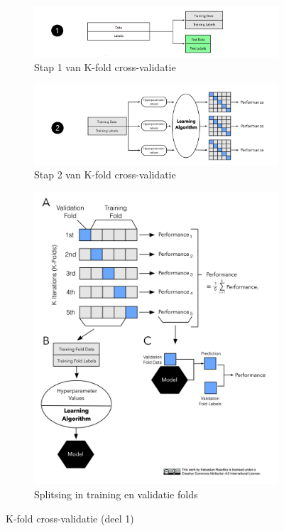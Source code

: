 \begin{figure}[h]
	\centering
	\begin{subfigure}{.70\textwidth}
		\centering
		\includegraphics[width=\linewidth]{images/21-kfold-step-1.png}
		\caption{Stap 1 van K-fold cross-validatie}
		\label{fig:kfold-step-1}
	\end{subfigure}
	\begin{subfigure}{.70\textwidth}
		\centering
		\includegraphics[width=\linewidth]{images/22-kfold-step-2.png}
		\caption{Stap 2 van K-fold cross-validatie}
		\label{fig:kfold-step-2}
	\end{subfigure}
	\begin{subfigure}{.5\textwidth}
		\centering
		\includegraphics[width=\linewidth]{images/26-kfold-folds.png}
		\caption{Splitsing in training en validatie folds}
		\label{fig:kfold-folds}
	\end{subfigure}
	\caption{K-fold cross-validatie (deel 1)}
	\label{fig:kfold}
\end{figure}
